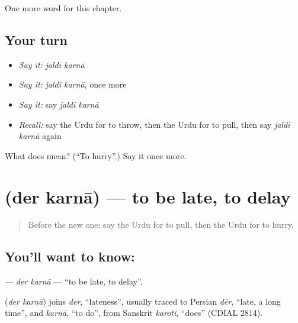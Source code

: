 \begin{grammarlens}[title={What you've built}]
One more word for this chapter.
\end{grammarlens}

\subsection*{Your turn}
\begin{itemize}
\raggedright
  \item \emph{Say it:} \emph{jaldī karnā}
  \item \emph{Say it:} \emph{jaldī karnā}, once more
  \item \emph{Say it:} say \emph{jaldī karnā}
  \item \emph{Recall:} say the Urdu for to throw, then the Urdu for to pull, then say \emph{jaldī karnā} again
\end{itemize}

\begin{tcolorbox}[breakable,colback=teal!4,colframe=teal!35!black,title={Before you move on}]
What does   mean? (\textquotedblleft{}To hurry\textquotedblright{}.) Say it once more.
\end{tcolorbox}
\section[\texorpdfstring{\ur{دیر} \ur{کرنا} (der karnā)}{دیر کرنا (der karnā)}]{  (der karnā) — to be late, to delay}

\label{lesson:UR-C214-der-karna}



\begin{quote}
Before the new one: say the Urdu for to pull, then the Urdu for to hurry.
\end{quote}

\subsection*{You'll want to know:  }
\textbf{ } — \emph{der karnā} — \textquotedblleft{}to be late, to delay\textquotedblright{}.

\begin{cousinweb}
\textbf{ } (\emph{der karnā}) joins \emph{der}, \textquotedblleft{}lateness\textquotedblright{}, usually traced to Persian \emph{dēr}, \textquotedblleft{}late, a long time\textquotedblright{}, and \emph{karnā}, \textquotedblleft{}to do\textquotedblright{}, from Sanskrit \emph{karoti}, \textquotedblleft{}does\textquotedblright{} (CDIAL 2814).
\end{cousinweb}

